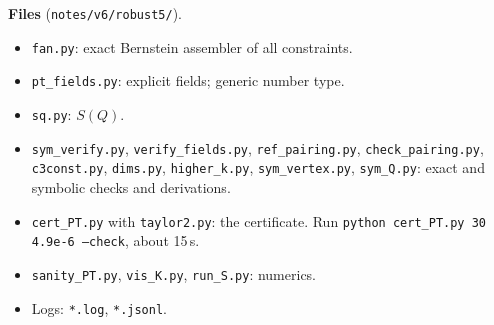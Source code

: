 \documentclass[11pt]{article}
\theoremstyle{remark}
\begin{document}
\noindent\textbf{Files} (\texttt{notes/v6/robust5/}).
\begin{itemize}
\item \texttt{fan.py}: exact Bernstein assembler of all constraints.
\item \texttt{pt\_fields.py}: explicit fields; generic number type.
\item \texttt{sq.py}: $S(Q)$.
\item \texttt{sym\_verify.py}, \texttt{verify\_fields.py}, \texttt{ref\_pairing.py}, \texttt{check\_pairing.py}, \texttt{c3const.py}, \texttt{dims.py},
 \texttt{higher\_k.py}, \texttt{sym\_vertex.py}, \texttt{sym\_Q.py}: exact and symbolic checks and derivations.
\item \texttt{cert\_PT.py} with \texttt{taylor2.py}: the certificate. Run \texttt{python cert\_PT.py 30 4.9e-6 --check}, about 15\,s.
\item \texttt{sanity\_PT.py}, \texttt{vis\_K.py}, \texttt{run\_S.py}: numerics.
\item Logs: \texttt{*.log}, \texttt{*.jsonl}.
\end{itemize}
\end{document}
